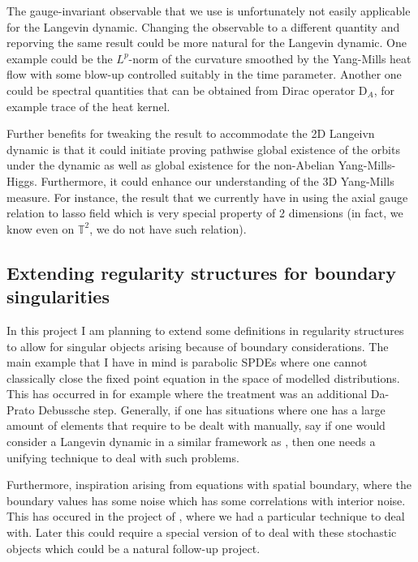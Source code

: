 \documentclass[11pt]{article}
\numberwithin{equation}{section}
\theoremstyle{definition}
\theoremstyle{remark}
\newcommand{\1}{\mathbf 1}
\newcommand{\<}{\langle}
\renewcommand{\>}{\rangle}
\newcommand{\rmD}{\mathrm{D}}
\newcommand{\bT}{\mathbb T}
\begin{document}
The gauge-invariant observable that we use is unfortunately not easily applicable for the Langevin dynamic. Changing the observable to a different quantity and reporving the same result could be more natural for the Langevin dynamic. One example could be the $L^p$-norm of the curvature smoothed by the Yang-Mills heat flow with some blow-up controlled suitably in the time parameter. Another one could be spectral quantities that can be obtained from Dirac operator $\rmD_A$, for example trace of the heat kernel. 

Further benefits for tweaking the result to accommodate the 2D Langeivn dynamic is that it could initiate proving pathwise global existence of the orbits under the dynamic as well as global existence for the non-Abelian Yang-Mills-Higgs. Furthermore,  it could enhance our understanding of the 3D Yang-Mills measure. For instance, the result that we currently have in  using the axial gauge relation to lasso field which is very special property of 2 dimensions (in fact, we know even on $\bT^2$, we do not have such relation).  


\subsection{Extending regularity structures for boundary singularities}
In this project I am planning to extend some definitions in regularity structures \cite{Hairer14} to allow for singular objects arising because of boundary considerations. The main example that I have in mind is parabolic SPDEs where one cannot classically close the fixed point equation in the space of modelled distributions. This has occurred in \cite{CCHS3d} for example where the treatment was an additional Da-Prato Debussche step. Generally, if one has situations where one has a large amount of elements that require to be dealt with manually, say if one would consider a Langevin dynamic in a similar framework as  \cite{CM24}, then one needs a unifying technique to deal with such problems. 

Furthermore, inspiration arising from equations with spatial boundary, where the boundary values has some noise which has some correlations with interior noise. This has occured in the project of , where we had a particular technique to deal with. Later this could require a special version of \cite{CH16} to deal with these stochastic objects which could be a natural follow-up project. 
\end{document}

